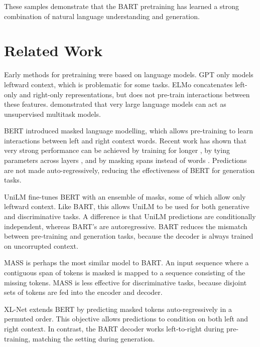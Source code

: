 \documentclass{article} %
\begin{document}
These samples demonstrate that the BART pretraining has learned a strong combination of natural language understanding and generation.




\section{Related Work}

Early methods for pretraining were based on language models. GPT \cite{gpt} only models leftward context, which is problematic for some tasks. ELMo \cite{elmo} concatenates left-only and right-only representations, but does not pre-train interactions between these features.
\citet{gpt2} demonstrated that very large language models can act as unsupervised multitask models.

BERT \citep{bert} introduced masked language modelling, which allows pre-training to learn interactions between left and right context words. 
Recent work has shown that very strong performance can be achieved by training for longer \citep{roberta}, by tying parameters across layers \citep{albert}, and by masking spans instead of words \citep{spanbert}.
Predictions are not made auto-regressively, reducing the effectiveness of BERT for generation tasks.

UniLM \citep{unilm} fine-tunes BERT with an ensemble of masks, some of which allow only leftward context. Like BART, this allows UniLM to be used for both generative and discriminative tasks. A difference is that UniLM predictions are conditionally independent, whereas BART's are autoregressive. BART reduces the mismatch between pre-training and generation tasks, because the decoder is always trained on uncorrupted context. %

MASS \citep{mass} is perhaps the most similar model to BART. An input sequence where a contiguous span of tokens is masked is mapped to a sequence consisting of the missing tokens. MASS is less effective for discriminative tasks, because disjoint sets of tokens are fed into the encoder and decoder.

XL-Net \cite{xlnet} extends BERT by predicting masked tokens auto-regressively in a permuted order. This objective allows predictions to condition on both left and right context. In contrast, the BART decoder works left-to-right during pre-training, matching the setting during generation.
\end{document}
